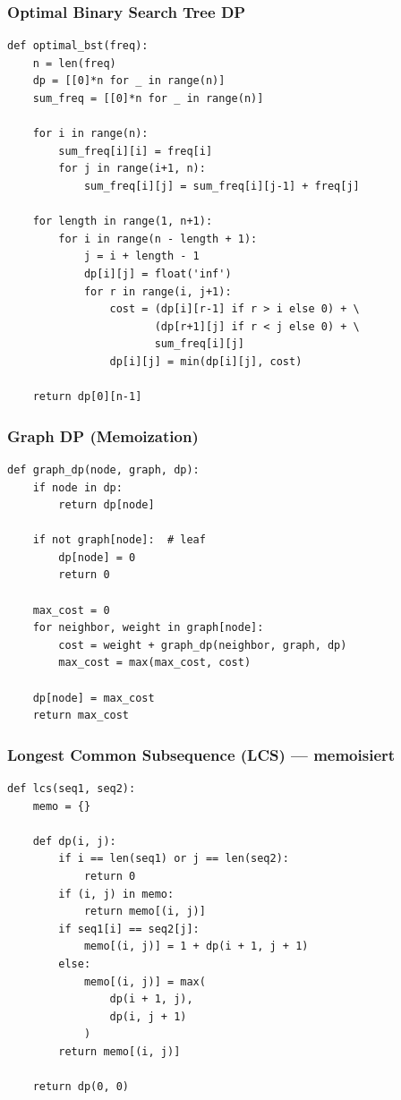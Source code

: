 \subsubsection{Optimal Binary Search Tree DP}
\begin{codebox}
\begin{lstlisting}[style=CodeExpert]
def optimal_bst(freq):
    n = len(freq)
    dp = [[0]*n for _ in range(n)]
    sum_freq = [[0]*n for _ in range(n)]

    for i in range(n):
        sum_freq[i][i] = freq[i]
        for j in range(i+1, n):
            sum_freq[i][j] = sum_freq[i][j-1] + freq[j]

    for length in range(1, n+1):
        for i in range(n - length + 1):
            j = i + length - 1
            dp[i][j] = float('inf')
            for r in range(i, j+1):
                cost = (dp[i][r-1] if r > i else 0) + \
                       (dp[r+1][j] if r < j else 0) + \
                       sum_freq[i][j]
                dp[i][j] = min(dp[i][j], cost)

    return dp[0][n-1]
\end{lstlisting}
\end{codebox}


\subsubsection{Graph DP (Memoization)}
\begin{codebox}
\begin{lstlisting}[style=CodeExpert]
def graph_dp(node, graph, dp):
    if node in dp:
        return dp[node]

    if not graph[node]:  # leaf
        dp[node] = 0
        return 0

    max_cost = 0
    for neighbor, weight in graph[node]:
        cost = weight + graph_dp(neighbor, graph, dp)
        max_cost = max(max_cost, cost)

    dp[node] = max_cost
    return max_cost
\end{lstlisting}
\end{codebox}



\subsubsection{Longest Common Subsequence (LCS) — memoisiert}
\begin{codebox}
\begin{lstlisting}[style=CodeExpert]
def lcs(seq1, seq2):
    memo = {}

    def dp(i, j):
        if i == len(seq1) or j == len(seq2):
            return 0
        if (i, j) in memo:
            return memo[(i, j)]
        if seq1[i] == seq2[j]:
            memo[(i, j)] = 1 + dp(i + 1, j + 1)
        else:
            memo[(i, j)] = max(
                dp(i + 1, j),
                dp(i, j + 1)
            )
        return memo[(i, j)]

    return dp(0, 0)
\end{lstlisting}
\end{codebox}

